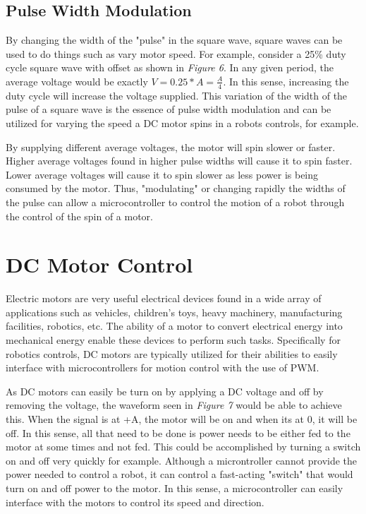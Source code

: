 \documentclass[12pt]{article}
\begin{document}
\subsection{Pulse Width Modulation}

By changing the width of the "pulse" in the square wave, square waves can be used to do things such as vary motor speed. For example, consider a 25\% duty cycle square wave with offset as shown in \textit{Figure 6}. In any given period, the average voltage would be exactly $V = 0.25 * A = \frac{A}{4}$. In this sense, increasing the duty cycle will increase the voltage supplied. This variation of the width of the pulse of a square wave is the essence of pulse width modulation and can be utilized for varying the speed a DC motor spins in a robots controls, for example.

By supplying different average voltages, the motor will spin slower or faster. Higher average voltages found in higher pulse widths will cause it to spin faster. Lower average voltages will cause it to spin slower as less power is being consumed by the motor. Thus, "modulating" or changing rapidly the widths of the pulse can allow a microcontroller to control the motion of a robot through the control of the spin of a motor.

\section{DC Motor Control}

Electric motors are very useful electrical devices found in a wide array of applications such as vehicles, children's toys, heavy machinery, manufacturing facilities, robotics, etc. The ability of a motor to convert electrical energy into mechanical energy enable these devices to perform such tasks. Specifically for robotics controls, DC motors are typically utilized for their abilities to easily interface with microcontrollers for motion control with the use of PWM. 

As DC motors can easily be turn on by applying a DC voltage and off by removing the voltage, the waveform seen in \textit{Figure 7} would be able to achieve this. When the signal is at +A, the motor will be on and when its at 0, it will be off. In this sense, all that need to be done is power needs to be either fed to the motor at some times and not fed. This could be accomplished by turning a switch on and off very quickly for example. Although a microntroller cannot provide the power needed to control a robot, it can control a fast-acting "switch" that would turn on and off power to the motor. In this sense, a microcontroller can easily interface with the motors to control its speed and direction.
\end{document}
